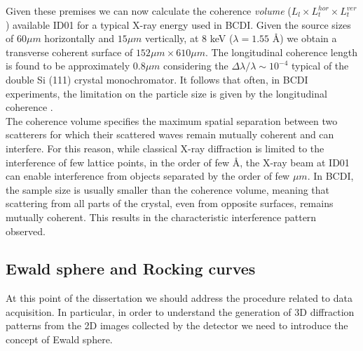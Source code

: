 Given these premises we can now calculate the coherence \textit{volume} ($L_l \times L_t^{hor} \times L_t^{ver}$) available 
ID01 for a typical X-ray energy used in BCDI. Given the source sizes of $60 \mu m$ horizontally and $15 \mu m $ vertically, 
at 8 keV ($\lambda = 1.55$ \r{A}) we obtain a transverse coherent surface of $152 \mu m \times 610 \mu m$. The longitudinal
coherence length is found to be approximately $0.8 \mu m$ considering the $\Delta \lambda / \lambda \sim 10^{-4}$ typical of the 
double Si (111) crystal monochromator. It follows that often, in BCDI experiments, the limitation on the particle size is 
given by the longitudinal coherence \cite{Steven2009}. \\ 

The coherence volume specifies the maximum spatial separation between two scatterers for which their scattered waves 
remain mutually coherent and can interfere. For this reason, while classical X-ray diffraction is limited to the interference 
of few lattice points, in the order of few \r{A}, the X-ray beam at ID01 can enable interference from objects separated by the order of few 
$\mu m$. In BCDI, the sample size is usually smaller than the coherence volume, meaning that scattering from all parts 
of the crystal, even from opposite surfaces, remains mutually coherent. This results in the characteristic interference 
pattern observed.

\subsection{Ewald sphere and Rocking curves}

At this point of the dissertation we should address the procedure related to data acquisition. In particular, in order to 
understand the generation of 3D diffraction patterns from the 2D images collected by the detector we need to introduce the 
concept of Ewald sphere. 


